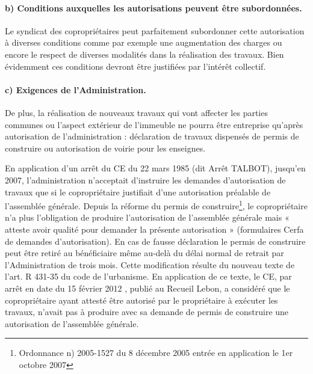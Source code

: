 			\paragraph{b) Conditions auxquelles les autorisations peuvent être subordonnées.}
			
				Le syndicat des copropriétaires peut parfaitement subordonner cette autorisation à diverses conditions comme par exemple une augmentation des charges ou encore le respect de diverses modalités dans la réalisation des travaux. Bien évidemment ces conditions devront être justifiées par l'intérêt collectif.
			
			\paragraph{c) Exigences de l’Administration.}
			
				De plus, la réalisation de nouveaux travaux qui vont affecter les parties communes ou l'aspect extérieur de l'immeuble ne pourra être entreprise qu'après autorisation de l'administration : déclaration de travaux dispensés de permis de construire ou autorisation de voirie pour les enseignes.
				
				En application d’un arrêt du CE du 22 mars 1985 (dit Arrêt TALBOT), jusqu’en 2007, l'administration n'acceptait d'instruire les demandes d'autorisation de travaux que si le copropriétaire justifiait d'une autorisation préalable de l'assemblée générale. Depuis la réforme du permis de construire\footnote{Ordonnance n) 2005-1527 du 8 décembre 2005 entrée en application le 1er octobre 2007}, le copropriétaire n’a plus l’obligation de produire l’autorisation de l’assemblée générale mais « atteste avoir qualité pour demander la présente autorisation » (formulaires Cerfa de demandes d’autorisation). En cas de fausse déclaration le permis de
				construire peut être retiré au bénéficiaire même au-delà du délai normal de retrait par l’Administration de trois mois.
				Cette modification résulte du nouveau texte de l’art. R 431-35 du code de l’urbanisme.
				En application de ce texte, le CE, par arrêt en date du 15 février 2012 , publié au Recueil Lebon, a considéré que le copropriétaire ayant attesté être autorisé par le propriétaire à exécuter les travaux, n’avait pas à produire avec sa demande de permis de construire une autorisation de l’assemblée générale.
				
